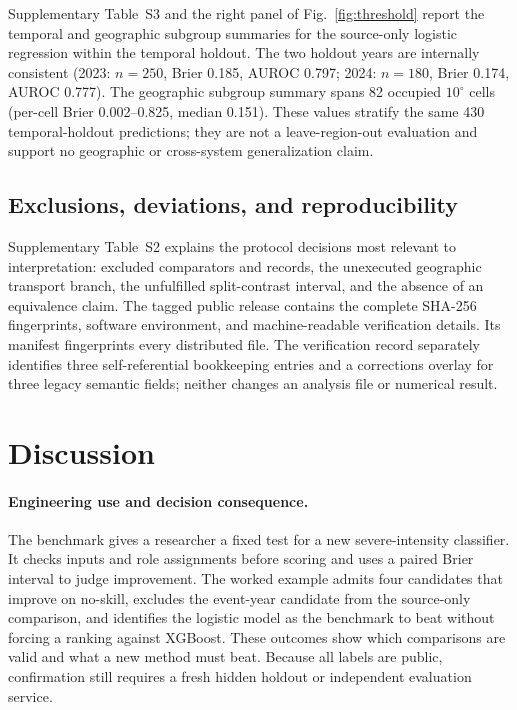 \documentclass[pdflatex,sn-basic,Numbered]{sn-jnl}
\begin{document}
Supplementary Table~S3 and the right panel of Fig.~\ref{fig:threshold} report the
temporal and geographic subgroup summaries for the source-only logistic
regression within the temporal holdout. The two
holdout years are internally consistent (2023: $n=250$, Brier 0.185, AUROC 0.797;
2024: $n=180$, Brier 0.174, AUROC 0.777). The geographic subgroup summary spans
82 occupied $10^\circ$ cells (per-cell Brier 0.002--0.825, median 0.151).
These values stratify the same 430 temporal-holdout predictions; they are not a
leave-region-out evaluation and support no geographic or cross-system
generalization claim.

\subsection{Exclusions, deviations, and reproducibility}\label{sec:repro-results}

Supplementary Table~S2 explains the protocol decisions most relevant to
interpretation: excluded comparators and records, the unexecuted geographic
transport branch, the unfulfilled split-contrast interval, and the absence of an
equivalence claim. The tagged public release contains the complete SHA-256
fingerprints, software environment, and machine-readable verification details.
Its manifest fingerprints every distributed file. The verification record
separately identifies three self-referential bookkeeping entries and a
corrections overlay for three legacy semantic fields; neither changes an
analysis file or numerical result.

\section{Discussion}\label{sec:discussion}

\paragraph{Engineering use and decision consequence.} The benchmark gives a
researcher a fixed test for a new severe-intensity classifier. It checks inputs
and role assignments before scoring and uses a paired Brier interval to judge
improvement. The worked example admits four candidates that improve on
no-skill, excludes the event-year candidate from the source-only comparison,
and identifies the logistic model as the benchmark to beat without forcing a
ranking against XGBoost. These outcomes show which comparisons are valid and
what a new method must beat. Because all labels are public, confirmation still
requires a fresh hidden holdout or independent evaluation service.
\end{document}
